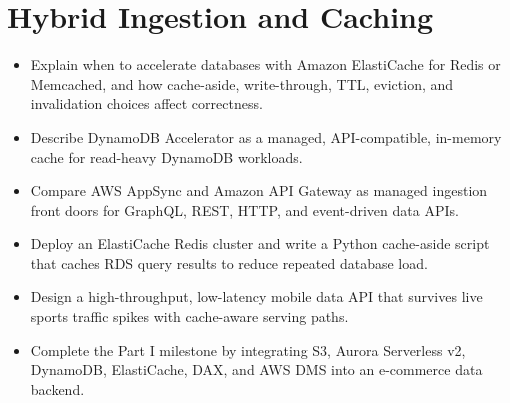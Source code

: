 \chapter{Hybrid Ingestion and Caching}
%
\begin{objectives}
\begin{itemize}
    \item Explain when to accelerate databases with Amazon ElastiCache for Redis or Memcached, and how cache-aside, write-through, TTL, eviction, and invalidation choices affect correctness.
    \item Describe DynamoDB Accelerator as a managed, API-compatible, in-memory cache for read-heavy DynamoDB workloads.
    \item Compare AWS AppSync and Amazon API Gateway as managed ingestion front doors for GraphQL, REST, HTTP, and event-driven data APIs.
    \item Deploy an ElastiCache Redis cluster and write a Python cache-aside script that caches RDS query results to reduce repeated database load.
    \item Design a high-throughput, low-latency mobile data API that survives live sports traffic spikes with cache-aware serving paths.
    \item Complete the Part I milestone by integrating S3, Aurora Serverless v2, DynamoDB, ElastiCache, DAX, and AWS DMS into an e-commerce data backend.
\end{itemize}
\end{objectives}
